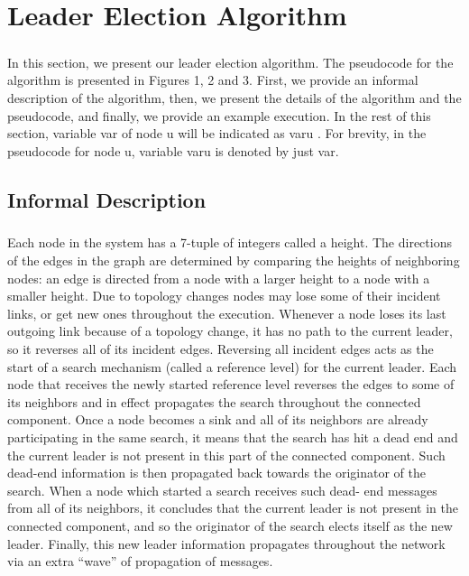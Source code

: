 \chapter{Leader Election Algorithm}
\paragraph{}In this section, we present our leader election algorithm. The pseudocode for the algorithm is presented in Figures 1, 2 and 3. First, we provide an informal description of the algorithm, then, we present the details of the algorithm and the pseudocode, and finally, we provide an example execution. In the rest of this section, variable var of node u will be indicated as varu . For brevity, in the pseudocode for node u, variable varu is denoted by just var.
\section{Informal Description}
\paragraph{}Each node in the system has a 7-tuple of integers called a height. The directions of the edges in the graph are determined by comparing the heights of neighboring nodes: an edge is directed from a node with a larger height to a node with a smaller height. Due to topology changes nodes may lose some of their incident links, or get new ones throughout the execution. Whenever a node loses its last outgoing link because of a topology change, it has no path to the current leader, so it reverses all of its incident edges. Reversing all incident edges acts as the start of a search mechanism (called a reference level) for the current leader. Each node that receives the newly started reference level reverses the edges to some of its neighbors and in effect propagates the search throughout the connected component. Once a node becomes a sink and all of its neighbors are already participating in the same search, it means that the search has hit a dead end and the current leader is not present in this part of the connected component. Such dead-end information is then propagated back towards the originator of the search. When a node which started a search receives such dead- end messages from all of its neighbors, it concludes that the current leader is not present in the connected component, and so the originator of the search elects itself as the new leader. Finally, this new leader information propagates throughout the network via an extra “wave” of propagation of messages.
